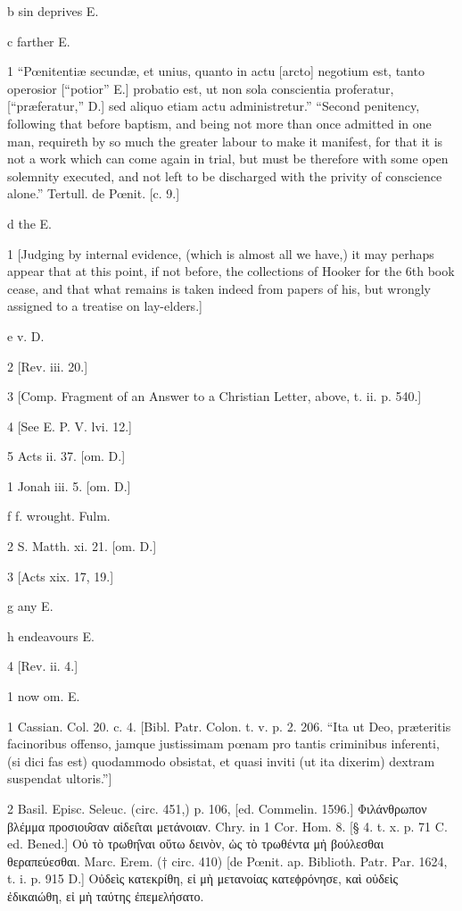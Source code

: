 b
sin deprives E.

c
farther E.

1
“Pœnitentiæ secundæ, et unius, quanto in actu [arcto] negotium est, tanto operosior [“potior” E.] probatio est, ut non sola conscientia proferatur, [“præferatur,” D.] sed aliquo etiam actu administretur.” “Second penitency, following that before baptism, and being not more than once admitted in one man, requireth by so much the greater labour to make it manifest, for that it is not a work which can come again in trial, but must be therefore with some open solemnity executed, and not left to be discharged with the privity of conscience alone.” Tertull. de Pœnit. [c. 9.]

d
the E.

1
[Judging by internal evidence, (which is almost all we have,) it may perhaps appear that at this point, if not before, the collections of Hooker for the 6th book cease, and that what remains is taken indeed from papers of his, but wrongly assigned to a treatise on lay-elders.]

e
v. D.

2
[Rev. iii. 20.]

3
[Comp. Fragment of an Answer to a Christian Letter, above, t. ii. p. 540.]

4
[See E. P. V. lvi. 12.]

5
Acts ii. 37. [om. D.]

1
Jonah iii. 5. [om. D.]

f
f. wrought. Fulm.

2
S. Matth. xi. 21. [om. D.]

3
[Acts xix. 17, 19.]

g
any E.

h
endeavours E.

4
[Rev. ii. 4.]

1
now om. E.

1
Cassian. Col. 20. c. 4. [Bibl. Patr. Colon. t. v. p. 2. 206. “Ita ut Deo, præteritis facinoribus offenso, jamque justissimam pœnam pro tantis criminibus inferenti, (si dici fas est) quodammodo obsistat, et quasi inviti (ut ita dixerim) dextram suspendat ultoris.”]

2
Basil. Episc. Seleuc. (circ. 451,) p. 106, [ed. Commelin. 1596.] Φιλάνθρωπον βλέμμα προσιου̑σαν αἰδει̑ται μετάνοιαν. Chry. in 1 Cor. Hom. 8. [§ 4. t. x. p. 71 C. ed. Bened.] Οὐ τὸ τρωθη̑ναι οὕτω δεινὸν, ὡς τὸ τρωθέντα μἠ βούλεσθαι θεραπεύεσθαι. Marc. Erem. († circ. 410) [de Pœnit. ap. Biblioth. Patr. Par. 1624, t. i. p. 915 D.] Οὐδεὶς κατεκρίθη, εἰ μὴ μετανοίας κατεϕρόνησε, καὶ οὐδεὶς ἐδικαιώθη, εἰ μὴ ταύτης ἐπεμελήσατο.

